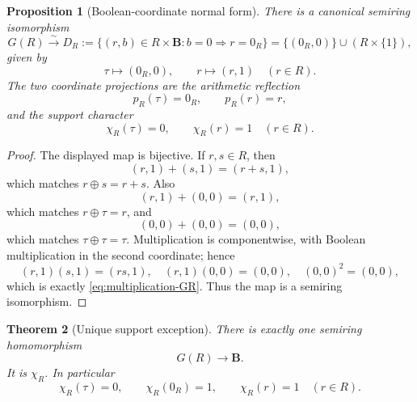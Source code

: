 \documentclass[11pt]{article}
\newcommand{\B}{\mathbf B}
\newcommand{\1}{\mathbf 1}
\newtheorem{theorem}{Theorem}[section]
\newtheorem{proposition}[theorem]{Proposition}
\numberwithin{equation}{section}
\begin{document}
\begin{proposition}[Boolean-coordinate normal form]\label{prop:DR}
There is a canonical semiring isomorphism
\begin{equation}
  G(R)\xrightarrow{\sim}
  D_R:=\{(r,b)\in R\times\B: b=0\Rightarrow r=0_R\}
       =\{(0_R,0)\}\cup (R\times\{1\}),
\end{equation}
given by
\begin{equation}
  \tau\longmapsto (0_R,0),
  \qquad
  r\longmapsto (r,1)\quad(r\in R).
\end{equation}
The two coordinate projections are the arithmetic reflection
\begin{equation}
  p_R(\tau)=0_R,
  \qquad p_R(r)=r,
\end{equation}
and the support character
\begin{equation}
  \chi_R(\tau)=0,
  \qquad \chi_R(r)=1\quad(r\in R).
\end{equation}
\end{proposition}

\begin{proof}
The displayed map is bijective.  If $r,s\in R$, then
\begin{equation}
  (r,1)+(s,1)=(r+s,1),
\end{equation}
which matches $r\oplus s=r+s$.  Also
\begin{equation}
  (r,1)+(0,0)=(r,1),
\end{equation}
which matches $r\oplus\tau=r$, and
\begin{equation}
  (0,0)+(0,0)=(0,0),
\end{equation}
which matches $\tau\oplus\tau=\tau$.  Multiplication is componentwise, with Boolean multiplication in the second coordinate; hence
\begin{equation}
  (r,1)(s,1)=(rs,1),\quad (r,1)(0,0)=(0,0),\quad (0,0)^2=(0,0),
\end{equation}
which is exactly \eqref{eq:multiplication-GR}.  Thus the map is a semiring isomorphism.
\end{proof}

\begin{theorem}[Unique support exception]\label{thm:unique-boolean-character}
There is exactly one semiring homomorphism
\begin{equation}
  G(R)\longrightarrow\B.
\end{equation}
It is $\chi_R$.  In particular
\begin{equation}
  \chi_R(\tau)=0,
  \qquad
  \chi_R(0_R)=1,
  \qquad
  \chi_R(r)=1\quad(r\in R).
\end{equation}
\end{theorem}
\end{document}
